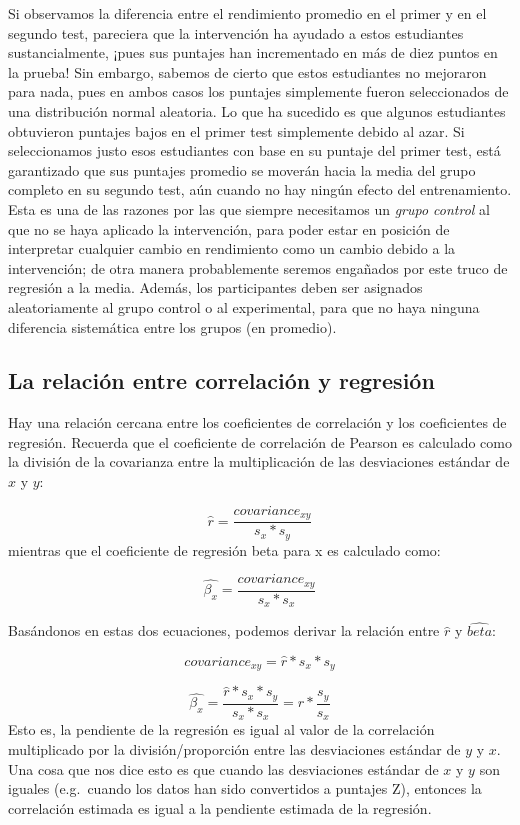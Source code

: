 \documentclass[
  12pt,
]{book}
\begin{document}
Si observamos la diferencia entre el rendimiento promedio en el primer y en el segundo test, pareciera que la intervención ha ayudado a estos estudiantes sustancialmente, ¡pues sus puntajes han incrementado en más de diez puntos en la prueba! Sin embargo, sabemos de cierto que estos estudiantes no mejoraron para nada, pues en ambos casos los puntajes simplemente fueron seleccionados de una distribución normal aleatoria. Lo que ha sucedido es que algunos estudiantes obtuvieron puntajes bajos en el primer test simplemente debido al azar. Si seleccionamos justo esos estudiantes con base en su puntaje del primer test, está garantizado que sus puntajes promedio se moverán hacia la media del grupo completo en su segundo test, aún cuando no hay ningún efecto del entrenamiento. Esta es una de las razones por las que siempre necesitamos un \emph{grupo control} al que no se haya aplicado la intervención, para poder estar en posición de interpretar cualquier cambio en rendimiento como un cambio debido a la intervención; de otra manera probablemente seremos engañados por este truco de regresión a la media. Además, los participantes deben ser asignados aleatoriamente al grupo control o al experimental, para que no haya ninguna diferencia sistemática entre los grupos (en promedio).

\hypertarget{la-relaciuxf3n-entre-correlaciuxf3n-y-regresiuxf3n}{%
\subsection{La relación entre correlación y regresión}\label{la-relaciuxf3n-entre-correlaciuxf3n-y-regresiuxf3n}}

Hay una relación cercana entre los coeficientes de correlación y los coeficientes de regresión. Recuerda que el coeficiente de correlación de Pearson es calculado como la división de la covarianza entre la multiplicación de las desviaciones estándar de \(x\) y \(y\):

\[
\hat{r} = \frac{covariance_{xy}}{s_x * s_y}
\]
mientras que el coeficiente de regresión beta para x es calculado como:

\[
\hat{\beta_x} = \frac{covariance_{xy}}{s_x*s_x}
\]

Basándonos en estas dos ecuaciones, podemos derivar la relación entre \(\hat{r}\) y \(\hat{beta}\):

\[
covariance_{xy} = \hat{r} * s_x * s_y
\]

\[
\hat{\beta_x} =  \frac{\hat{r} * s_x * s_y}{s_x * s_x} = r * \frac{s_y}{s_x}
\]
Esto es, la pendiente de la regresión es igual al valor de la correlación multiplicado por la división/proporción entre las desviaciones estándar de \(y\) y \(x\). Una cosa que nos dice esto es que cuando las desviaciones estándar de \(x\) y \(y\) son iguales (e.g.~cuando los datos han sido convertidos a puntajes Z), entonces la correlación estimada es igual a la pendiente estimada de la regresión.
\end{document}

